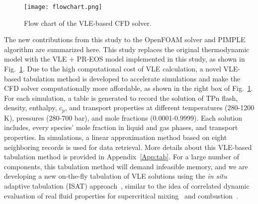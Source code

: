 
\begin{figure}[htbp]
    \centering
    \texttt{[image: flowchart.png]}
    \centering
    \caption{Flow chart of the VLE-based CFD solver.}
    \label{FC_CFD}
\end{figure}

The new contributions from this study to the OpenFOAM solver and PIMPLE algorithm are summarized here. 
This study replaces the original thermodynamic model with the VLE + PR-EOS model implemented in this study, as shown in Fig.~\ref{FC_CFD}.
Due to the high computational cost of VLE calculation, %
a novel VLE-based tabulation method is developed to accelerate simulations and make the CFD solver computationally more affordable, as shown in the right box of Fig.~\ref{FC_CFD}. For each simulation, a table is generated to record the solution of TPn flash, density, enthalpy, $c_p$, and transport properties at different temperatures (280-1200 K), pressures (280-700 bar), and  mole fractions (0.0001-0.9999). Each solution includes, every species' mole fraction in liquid and gas phases, and transport properties. In simulations, a linear approximation method based on eight neighboring records is used for data retrieval. More details about this VLE-based tabulation method is provided in Appendix~\ref{App:tab}. For a large number of components, this tabulation method will demand infeasible memory, and we are developing a new on-the-fly tabulation of VLE solutions using the \textit{in situ} adaptive tabulation (ISAT) approach~\cite{zhang2021multi}, similar to the idea of correlated dynamic evaluation of real fluid properties for supercritical mixing~\cite{yang2017comparison} and combustion~\cite{milan2019time}.


